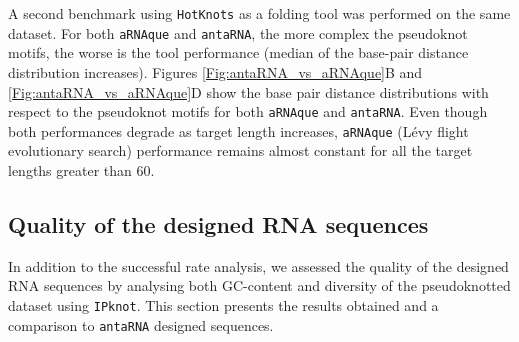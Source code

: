 A second benchmark using \texttt{HotKnots} as a folding tool was performed on the same dataset. For both \texttt{aRNAque} and \texttt{antaRNA}, the more complex the pseudoknot motifs, the worse is the tool performance (median of the base-pair distance distribution increases). Figures \ref{Fig:antaRNA_vs_aRNAque}B and \ref{Fig:antaRNA_vs_aRNAque}D show the base pair distance distributions with respect to the pseudoknot motifs for both \texttt{aRNAque} and \texttt{antaRNA}. Even though both performances degrade as target length increases, \texttt{aRNAque} (Lévy flight evolutionary search) performance remains almost constant for all the target lengths greater than $60$.
\subsection{Quality of the designed RNA sequences}
In addition to the successful rate analysis, we assessed the quality of the designed RNA sequences by analysing both GC-content and diversity of the pseudoknotted dataset using \texttt{IPknot}. This section presents the results obtained and a comparison to \texttt{antaRNA} designed sequences. 
